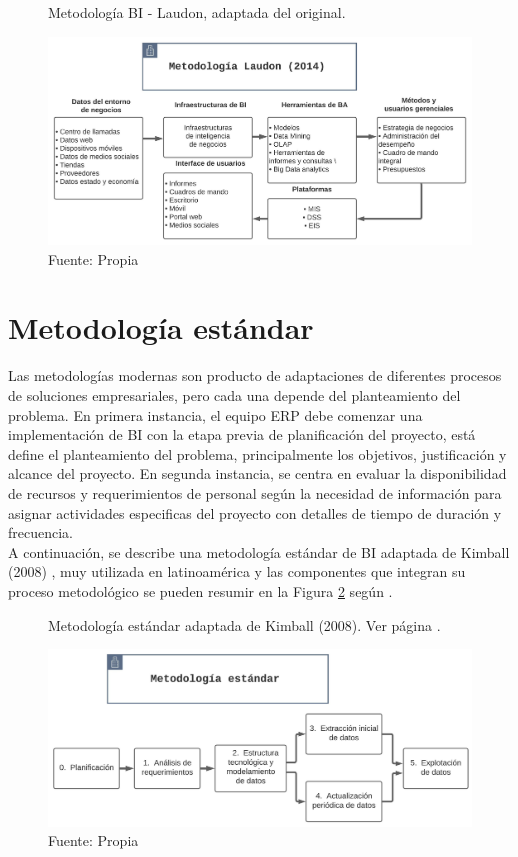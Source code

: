 \documentclass[12pt,jou]{apa7}
\begin{document}
\begin{figure}[h]
\caption{Metodología BI - Laudon, adaptada del original.}
\centering
\includegraphics[width=1\linewidth]{Figuras/MetLaudon}
\caption*{Fuente: Propia}
\label{fig: metLaudon}
\end{figure}

\section{Metodología estándar}
Las metodologías modernas son producto de adaptaciones de diferentes procesos de soluciones empresariales, pero cada una depende del planteamiento del problema. En primera instancia, el equipo ERP debe comenzar una implementación de BI con la etapa previa de planificación del proyecto, está define el planteamiento del problema, principalmente los objetivos, justificación y alcance del  proyecto. En segunda instancia, se centra en evaluar la disponibilidad de recursos y requerimientos de personal según la necesidad de información para asignar actividades especificas del proyecto con detalles de tiempo de duración  y frecuencia.\\ 

A continuación, se describe una metodología estándar de BI adaptada de Kimball (2008) \cite{Turban}, muy utilizada en latinoamérica y las componentes que integran su proceso metodológico se pueden resumir en la Figura \ref{fig: metEstandar} según \cite{LaPlata}.

\begin{figure}[h] 
\caption{Metodología estándar adaptada de Kimball (2008). Ver página \pageref{Met_estandar}.}
\centering
\includegraphics[width=1\linewidth]{Figuras/Met_estandar}
\caption*{ Fuente: Propia}
\label{fig: metEstandar}
\end{figure}
\end{document}
